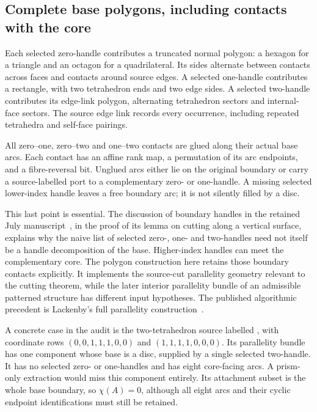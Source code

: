 \subsection{Complete base polygons, including contacts with the core}

Each selected zero-handle contributes a truncated normal polygon: a hexagon
for a triangle and an octagon for a quadrilateral. Its sides alternate
between contacts across faces and contacts around source edges. A selected
one-handle contributes a rectangle, with two tetrahedron ends and two edge
sides. A selected two-handle contributes its edge-link polygon, alternating
tetrahedron sectors and internal-face sectors. The source edge link records
every occurrence, including repeated tetrahedra and self-face pairings.

All zero--one, zero--two and one--two contacts are glued along their actual
base arcs. Each contact has an affine rank map, a permutation of its arc
endpoints, and a fibre-reversal bit. Unglued arcs either lie on the original
boundary or carry a source-labelled port to a complementary zero- or
one-handle. A missing selected lower-index handle leaves a free boundary arc;
it is not silently filled by a disc.

This last point is essential. The discussion of boundary handles in the
retained July manuscript~\cite{lackenby2026}, in the proof of its lemma on
cutting along a vertical surface, explains why the naive list of selected
zero-, one- and two-handles need not itself be a handle decomposition of the
base. Higher-index handles can meet the complementary core. The polygon
construction here retains those boundary contacts explicitly. It implements
the source-cut parallelity geometry relevant to the cutting theorem, while
the later interior parallelity bundle of an admissible patterned structure
has different input hypotheses. The published algorithmic precedent is
Lackenby's full parallelity construction~\cite{lackenby-parallelity}.

A concrete case in the audit is the two-tetrahedron source labelled
, with coordinate rows
$(0,0,1,1,1,0,0)$ and $(1,1,1,1,0,0,0)$. Its parallelity bundle has one
component whose base is a disc, supplied by a single selected two-handle.
It has no selected zero- or one-handles and has eight core-facing arcs.
A prism-only extraction would miss this component entirely. Its attachment
subset is the whole base boundary, so $\chi(A)=0$, although all eight arcs
and their cyclic endpoint identifications must still be retained.

